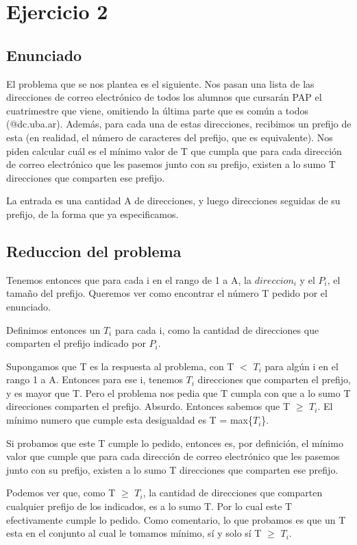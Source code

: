 \section{Ejercicio 2}

\subsection{Enunciado}

El problema que se nos plantea es el siguiente. Nos pasan una lista de las direcciones de correo electrónico de todos los alumnos que cursarán PAP el cuatrimestre que viene, omitiendo la última parte que es común a todos (@dc.uba.ar). Además, para cada una de estas direcciones, recibimos un prefijo de esta (en realidad, el número de caracteres del prefijo, que es equivalente).
Nos piden calcular cuál es el mínimo valor de T que cumpla que para cada dirección
de correo electrónico que les pasemos junto con su prefijo, existen a lo sumo T direcciones que comparten ese prefijo.

La entrada es una cantidad A de direcciones, y luego direcciones seguidas de su prefijo, de la forma que ya especificamos.

\subsection{Reduccion del problema}

Tenemos entonces que para cada i en el rango de 1 a A, la $direccion_i$ y el $P_i$, el tamaño del prefijo.
Queremos ver como encontrar el número T pedido por el enunciado.
\par{Definimos entonces un $T_i$ para cada i, como la cantidad de direcciones que comparten el prefijo indicado por $P_i$. }
\par{Supongamos que T es la respuesta al problema, con T $<$ $T_i$ para algún i en el rango 1 a A. Entonces para ese i, tenemos $T_i$ direcciones que comparten el prefijo, y es mayor que T. Pero el problema nos pedia que T cumpla con que a lo sumo T direcciones comparten el prefijo. Absurdo.
Entonces sabemos que T $\geq$ $T_i$. El mínimo numero que cumple esta desigualdad es T = max\{$T_i$\}.} \par{Si probamos que este T cumple lo pedido, 
entonces es, por definición, el mínimo valor que cumple que para cada dirección
de correo electrónico que les pasemos junto con su prefijo, existen a lo sumo T direcciones que comparten ese prefijo.}
\par{Podemos ver que, como T $\geq$ $T_i$, la cantidad de direcciones que comparten cualquier prefijo de los indicados, es a lo sumo T.
Por lo cual este T efectivamente cumple lo pedido. 
Como comentario, lo que probamos es que un T esta en el conjunto al cual le tomamos mínimo, sí y solo sí T $\geq$ $T_i$.}

